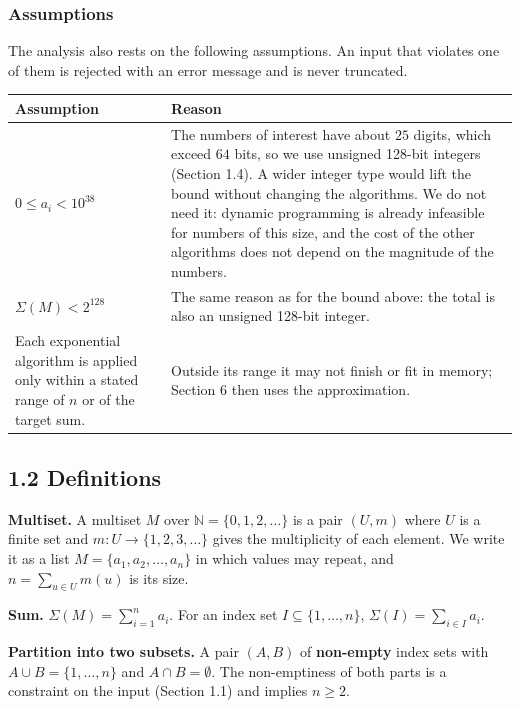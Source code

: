 \documentclass[
]{article}
\begin{document}
\hypertarget{assumptions}{%
\subsubsection{Assumptions}\label{assumptions}}

The analysis also rests on the following assumptions. An input that
violates one of them is rejected with an error message and is never
truncated.

\begin{longtable}[]{@{}>{\raggedright\arraybackslash}p{}>{\raggedright\arraybackslash}p{}@{}}
\toprule
Assumption & Reason \\
\midrule
\endhead
\(0 \le a_i < 10^{38}\) & The numbers of interest have about \(25\) digits, which exceed \(64\)
bits, so we use unsigned 128-bit integers (Section 1.4). A wider integer
type would lift the bound without changing the algorithms. We do not
need it: dynamic programming is already infeasible for numbers of this
size, and the cost of the other algorithms does not depend on the
magnitude of the numbers. \\
\midrule
\(\Sigma(M) < 2^{128}\) & The same reason as for the bound above: the total is also an unsigned
128-bit integer. \\
\midrule
Each exponential algorithm is applied only within a stated range of
\(n\) or of the target sum. & Outside its range it may not finish or fit in memory; Section 6 then
uses the approximation. \\
\bottomrule
\end{longtable}

\hypertarget{definitions}{%
\subsection{1.2 Definitions}\label{definitions}}

\textbf{Multiset.} A multiset \(M\) over
\(\mathbb{N} = \{0, 1, 2, \dots\}\) is a pair \((U, m)\) where \(U\) is
a finite set and \(m: U \to \{1, 2, 3, \dots\}\) gives the multiplicity
of each element. We write it as a list \(M = \{a_1, a_2, \dots, a_n\}\)
in which values may repeat, and \(n = \sum_{u \in U} m(u)\) is its size.

\textbf{Sum.} \(\Sigma(M) = \sum_{i=1}^{n} a_i\). For an index set
\(I \subseteq \{1,\dots,n\}\), \(\Sigma(I) = \sum_{i \in I} a_i\).

\textbf{Partition into two subsets.} A pair \((A, B)\) of
\textbf{non-empty} index sets with \(A \cup B = \{1,\dots,n\}\) and
\(A \cap B = \emptyset\). The non-emptiness of both parts is a
constraint on the input (Section 1.1) and implies \(n \ge 2\).
\end{document}
